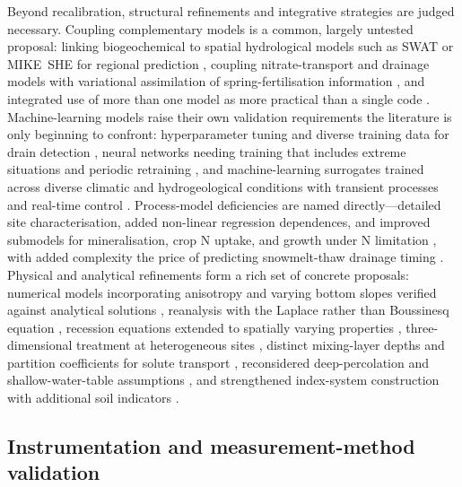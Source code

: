 Beyond recalibration, structural refinements and integrative strategies are
judged necessary. Coupling complementary models is a common, largely untested
proposal: linking biogeochemical to spatial hydrological models such as SWAT or
MIKE~SHE for regional prediction \parencite{Li2006}, coupling nitrate-transport
and drainage models with variational assimilation of spring-fertilisation
information \parencite{Chelil2022}, and integrated use of more than one model as
more practical than a single code \parencite{Singh2019b,Apostel2021}.
Machine-learning models raise their own validation requirements the literature
is only beginning to confront: hyperparameter tuning and diverse training data
for drain detection \parencite{Song2021}, neural networks needing training that
includes extreme situations and periodic retraining \parencite{Yang2000}, and
machine-learning surrogates trained across diverse climatic and hydrogeological
conditions with transient processes and real-time control
\parencite{Lei2026,Schneider2022}. Process-model deficiencies are named
directly---detailed site characterisation, added non-linear regression
dependences, and improved submodels for mineralisation, crop N uptake, and
growth under N limitation \parencite{Ahuja2007,Ikenberry2017}, with added
complexity the price of predicting snowmelt-thaw drainage timing
\parencite{Feyereisen2007}. Physical and analytical refinements form a rich set
of concrete proposals: numerical models incorporating anisotropy and varying
bottom slopes verified against analytical solutions \parencite{Lin2025,Kacimov2000},
reanalysis with the Laplace rather than Boussinesq equation \parencite{Bouarfa2000},
recession equations extended to spatially varying properties \parencite{Cooke2001},
three-dimensional treatment at heterogeneous sites \parencite{Mohanty1997},
distinct mixing-layer depths and partition coefficients for solute transport
\parencite{Shalit1996}, reconsidered deep-percolation and shallow-water-table
assumptions \parencite{Kolars2019}, and strengthened index-system construction
with additional soil indicators \parencite{Hou2018}.

\subsection{Instrumentation and measurement-method validation}

